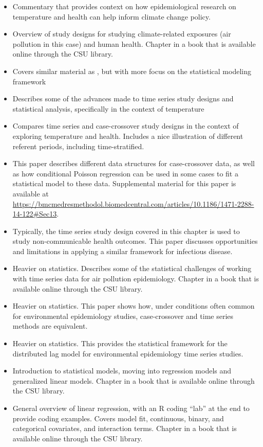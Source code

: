 \documentclass[
]{book}
\providecommand{\tightlist}{%
  \setlength{\itemsep}{0pt}\setlength{\parskip}{0pt}}
\begin{document}
\begin{itemize}
\tightlist
\item
  \citet{armstrong2012commentary} Commentary that provides context on how epidemiological
  research on temperature and health can help inform climate change policy.
\item
  \citet{dominici2008statistical1} Overview of study designs for studying climate-related
  exposures (air pollution in this case) and human health. Chapter in a book that is
  available online through the CSU library.
\item
  \citet{armstrong2006models} Covers similar material as \citet{bhaskaran2013time}, but with
  more focus on the statistical modeling framework
\item
  \citet{gasparrini2010time} Describes some of the advances made to time series study
  designs and statistical analysis, specifically in the context of temperature
\item
  \citet{basu2005temperature} Compares time series and case-crossover study designs in
  the context of exploring temperature and health. Includes a nice illustration
  of different referent periods, including time-stratified.
\item
  \citet{armstrong2014conditional} This paper describes different data structures for
  case-crossover data, as well as how conditional Poisson regression can be used
  in some cases to fit a statistical model to these data.
  Supplemental material for this paper is available at
  \url{https://bmcmedresmethodol.biomedcentral.com/articles/10.1186/1471-2288-14-122\#Sec13}.
\item
  \citet{imai2015time} Typically, the time series study design covered in this
  chapter is used to study non-communicable health outcomes. This paper discusses
  opportunities and limitations in applying a similar framework for infectious
  disease.
\item
  \citet{dominici2008statistical4} Heavier on statistics. Describes some of the
  statistical challenges of working with time series data for air pollution
  epidemiology. Chapter in a book that is available online through the CSU library.
\item
  \citet{lu2007equivalence} Heavier on statistics. This paper shows how, under
  conditions often common for environmental epidemiology studies, case-crossover
  and time series methods are equivalent.
\item
  \citet{gasparrini2014modeling} Heavier on statistics. This provides the statistical
  framework for the distributed lag model for environmental epidemiology time
  series studies.
\item
  \citet{dunn2018generalized1} Introduction to statistical models, moving into regression models and
  generalized linear models. Chapter in a book that is available online through the CSU library.
\item
  \citet{james2013introduction3} General overview of linear regression, with an R coding
  ``lab'' at the end to provide coding examples. Covers model fit, continuous, binary,
  and categorical covariates, and interaction terms. Chapter in a book that is
  available online through the CSU library.
\end{itemize}
\end{document}

